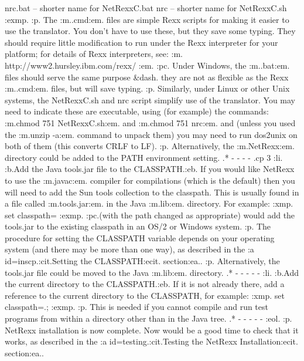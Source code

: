 nrc.bat      -- shorter name for NetRexxC.bat
nrc          -- shorter name for NetRexxC.sh
:exmp.
:p.
The :m..cmd:em. files are simple Rexx scripts for making it easier to
use the translator.  You don't have to use these, but they save some
typing.  They should require little modification to run under the Rexx
interpreter for your platform; for details of Rexx interpreters,
see: :m.
http://www2.hursley.ibm.com/rexx/
:em.
:pc.
Under Windows, the :m..bat:em. files should serve the same
purpose &dash. they are not as flexible as the Rexx :m..cmd:em. files,
but will save typing.
:p.
Similarly, under Linux or other Unix systems, the NetRexxC.sh and nrc
script simplify use of the translator.  You may need to indicate these
are executable, using (for example) the commands: :m.chmod 751
NetRexxC.sh:em. and :m.chmod 751 nrc:em. and (unless you used
the :m.unzip -a:em. command to unpack them) you may need to run dos2unix
on both of them (this converts CRLF to LF).
:p.
Alternatively, the :m.NetRexx\bin:em. directory could be added to the
PATH environment setting.
.* - - - -
.cp 3
:li.
:b.Add the Java tools.jar file to the CLASSPATH.:eb.
If you would like NetRexx to use the :m.javac:em. compiler for
compilations (which is the default) then you will need to add the Sun
tools collection to the classpath.  This is usually found in a file
called :m.tools.jar:em. in the Java :m.lib:em. directory.  For example:
:xmp.
set classpath=%
:exmp.
:pc.(with the path changed as appropriate) would add the tools.jar to the
existing classpath in an OS/2 or Windows system.
:p.
The procedure for setting the CLASSPATH variable depends on your
operating system (and there may be more than one way), as
described in the :a id=inscp.:cit.Setting the CLASSPATH:ecit. section:ea..
:p.
Alternatively, the tools.jar file could be moved to the Java :m.lib\ext:em.
directory.
.* - - - - -
:li.
:b.Add the current directory to the CLASSPATH.:eb.
If it is not already there, add a reference to the current directory to
the CLASSPATH, for example:
:xmp.
set classpath=.;%
:exmp.
:p.
This is needed if you cannot compile and run test programs from within a
directory other than in the Java tree.
.* - - - - -
:eol.
:p.
NetRexx installation is now complete.  Now would be a good time to check
that it works, as described in the :a id=testing.:cit.Testing the NetRexx
Installation:ecit. section:ea..

